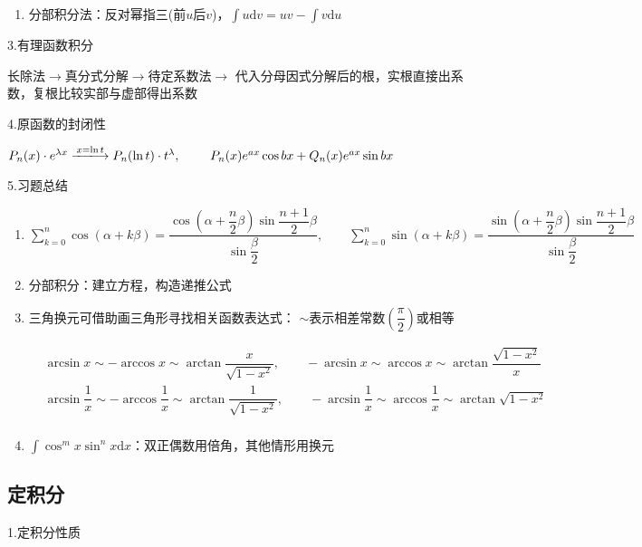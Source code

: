 \documentclass[UTF8]{ctexart}
\newcommand\dif{\mathrm{d}}
\newcommand\no{\noindent}
\newcommand\dis{\displaystyle}
\newcommand\sumkn{\dis\sum\limits_{k=0}^n}
\newcommand\intd{\dis\int}
\begin{document}
\begin{spacing}{2}
\begin{enumerate}[itemindent=1.4em, label=(\arabic*)]
\item 分部积分法：反对幂指三(前$u$后$v$)，$\intd u\dif v=uv-\intd v\dif u$

\end{enumerate}

\no3.有理函数积分

长除法$\longrightarrow$真分式分解$\longrightarrow$待定系数法$\longrightarrow$
代入分母因式分解后的根，实根直接出系数，复根比较实部与虚部得出系数

\no4.原函数的封闭性

$P_n(x)\cdot e^{\lambda x}\xlongrightarrow{x=\ln t}P_n(\ln t)\cdot t^\lambda,\ 
\qquad
P_n(x)e^{ax}\cos bx+Q_n(x)e^{ax}\sin bx$

\no5.习题总结

\begin{enumerate}[itemindent=1.4em, label=(\arabic*)]

\item $\sumkn \cos (\alpha +k\beta)=\dfrac{\cos\left(\alpha+\dfrac{n}{2}\beta\right)
\sin \dfrac{n+1}{2}\beta}{\sin\dfrac{\beta}{2}},
\qquad
\sumkn \sin (\alpha +k\beta)=\dfrac{\sin\left(\alpha+\dfrac{n}{2}\beta\right)
\sin \dfrac{n+1}{2}\beta}{\sin\dfrac{\beta}{2}}$

\item 分部积分：建立方程，构造递推公式

\item 三角换元可借助画三角形寻找相关函数表达式：
$\sim$表示相差常数$\left(\dfrac{\pi}{2}\right)$或相等

$\begin{aligned}
&\arcsin x\sim-\arccos x\sim\arctan\dfrac{x}{\sqrt{1-x^2}},\qquad
-\arcsin x\sim\arccos x\sim\arctan\dfrac{\sqrt{1-x^2}}{x}\\
&\arcsin \dfrac{1}{x}\sim-\arccos \dfrac{1}{x}\sim\arctan\dfrac{1}{\sqrt{1-x^2}},\qquad
-\arcsin \dfrac{1}{x}\sim\arccos \dfrac{1}{x}\sim\arctan\sqrt{1-x^2}\\
\end{aligned}$

\item $\intd\cos^mx\sin^nx\dif x$：双正偶数用倍角，其他情形用换元

\end{enumerate}

\subsection{定积分}

\no1.定积分性质


\end{spacing}
\end{document}
